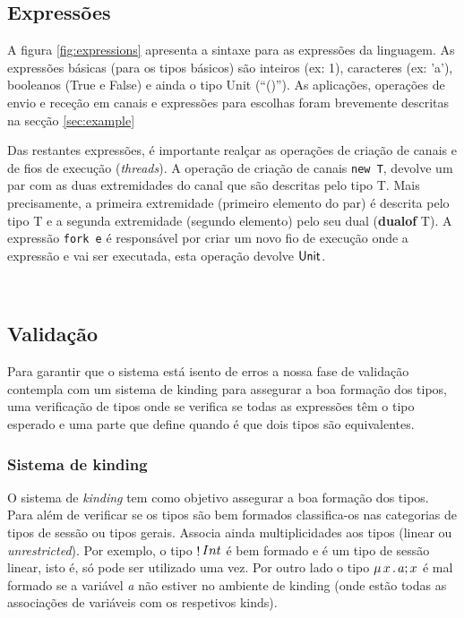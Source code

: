 \subsection{Expressões}
A figura \ref{fig:expressions} apresenta a sintaxe para as expressões da linguagem. As expressões básicas (para os tipos básicos) são inteiros (ex: 1), caracteres (ex: 'a'), booleanos (True e False) e ainda o tipo Unit (``()'').
As aplicações, operações de envio e receção em canais e expressões para escolhas foram brevemente descritas na secção \ref{sec:example}

Das restantes expressões, é importante realçar as operações de criação de canais e de fios de execução (\textit{threads}).
A operação de criação de canais \lstinline"new T", devolve um par com as duas extremidades do canal que são descritas pelo tipo T. Mais precisamente, a primeira extremidade (primeiro elemento do par) é descrita pelo tipo T e a segunda extremidade (segundo elemento) pelo seu dual (\textbf{dualof} T).
A expressão \lstinline"fork e" é responsável por criar um novo fio de execução onde a expressão e vai ser executada, esta operação devolve $\mathsf{Unit}$.


\\
\subsection{Validação}

Para garantir que o sistema está isento de erros a nossa fase de validação contempla com um sistema de kinding para assegurar a boa formação dos tipos, uma verificação de tipos onde se verifica se todas as expressões têm o tipo esperado e uma parte que define quando é que dois tipos são equivalentes.

\subsubsection{Sistema de kinding}
O sistema de \textit{kinding} tem como objetivo assegurar a boa formação dos tipos. Para além de verificar se os tipos são bem formados classifica-os nas categorias de tipos de sessão ou tipos gerais. Associa ainda multiplicidades aos tipos (linear ou \textit{unrestricted}).
Por exemplo, o tipo $\mathop! Int$ é bem formado e é um tipo de sessão linear, isto é, só pode ser utilizado uma vez. Por outro lado o tipo $\mu\,x\,.\,a;x$ é mal formado se a variável \textit{a} não estiver no ambiente de kinding (onde estão todas as associações de variáveis com os respetivos kinds).

